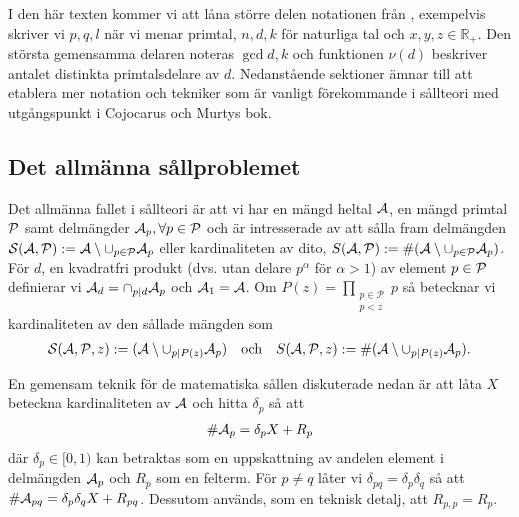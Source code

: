 
I den här texten kommer vi att låna större delen notationen från \cite{cojocarumurty}, exempelvis skriver vi \(p, q, l\) när vi menar primtal, \(n, d, k\) för naturliga tal och \(x, y, z \in \mathbb{R}_+\). Den största gemensamma delaren noteras \(\gcd{d, k}\) och funktionen \(\nu(d)\) beskriver antalet distinkta primtalsdelare av \(d\). Nedanstående sektioner ämnar till att etablera mer notation och tekniker som är vanligt förekommande i sållteori med utgångspunkt i Cojocarus och Murtys bok.

\subsection{Det allmänna sållproblemet}
Det allmänna fallet i sållteori är att vi har en mängd heltal \(\A\), en mängd primtal \(\P\) samt delmängder \(\A_p, \forall p \in \P\) och är intresserade av att sålla fram delmängden \(\mathcal{S}(\A, \P) := \A \setminus \cup_{p \in \P} \A_p\) eller kardinaliteten av dito, \(S(\A, \P) :=\card{(\A \setminus \cup_{p \in \P} \A_p)}\). För \(d\), en kvadratfri produkt (dvs. utan delare \(p^\alpha\) för \(\alpha > 1\)) av element \(p \in \P\) definierar vi \(\A_d = \cap_{p \divides d} \A_p\) och \(\A_1 = \A\). Om \(P(z) = \prod_{\substack{p\in \mathcal{P} \\ p < z}} p\) så betecknar vi kardinaliteten av den sållade mängden som
\begin{align*}
    \mathcal{S}(\A, \P, z) := (\A \setminus \cup_{p \divides P(z)} \A_p)
    \quad \text{och} \quad
    \S{A}{P}{z} := \card{(\A \setminus \cup_{p \divides P(z)} \A_p)} .
\end{align*}

En gemensam teknik för de matematiska sållen diskuterade nedan är att låta \(X\) beteckna kardinaliteten av \(\A\) och hitta \(\delta_p\) så att
\begin{align*}
    \card{\A_p} = \delta_p X + R_p
\end{align*}
där \(\delta_p \in [0, 1)\) kan betraktas som en uppskattning av andelen element i delmängden \(\A_p\) och \(R_p\) som en felterm. För \(p \neq q\) låter vi \(\delta_{pq} = \delta_p \delta_q\) så att \(\card{\A_{pq}} = \delta_p \delta_q X + R_{pq}\). Dessutom används, som en teknisk detalj, att \(R_{p,p} = R_p\).


